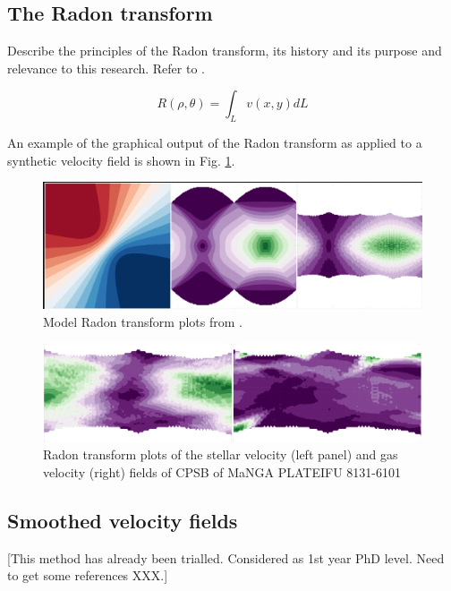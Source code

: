 \subsection{The Radon transform}
Describe the principles of the Radon transform, its history and its purpose and relevance to this research. Refer to \cite{2018MNRAS.480.2217S}.

\begin{equation}
    \label{eqn:radon}
    R(\rho,\theta)=\int_{L}{v(x,y) dL} 
\end{equation}

An example of the graphical output of the Radon transform as applied to a synthetic velocity field is shown in Fig. \ref{fig:Radon}.

\begin{figure}
    \centering
   	\includegraphics{images/RadonPlots/example2.png}
    \caption{Model Radon transform plots from \citet{2018MNRAS.480.2217S}.}
    \label{fig:Radon}
\end{figure}


\begin{figure}
    \centering
   	\includegraphics[width=\columnwidth]{images/RadonPlots/RT-snips/CPSB-8313-6101-RT-snip.png}
    \caption{Radon transform plots of the stellar velocity (left panel) and gas velocity (right) fields of CPSB of MaNGA PLATEIFU 8131-6101}
    \label{fig:RT_8131-6101}
\end{figure}

\subsection{Smoothed velocity fields}
[This method has already been trialled. Considered as 1st year PhD level. Need to get some references XXX.]